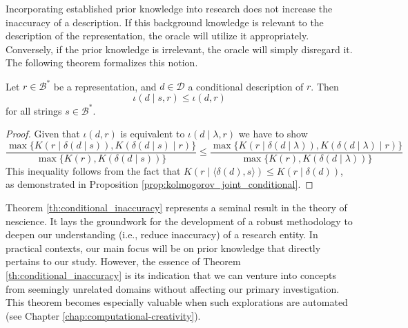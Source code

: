 Incorporating established prior knowledge into research does not increase the inaccuracy of a description. If this background knowledge is relevant to the description of the representation, the oracle will utilize it appropriately. Conversely, if the prior knowledge is irrelevant, the oracle will simply disregard it. The following theorem formalizes this notion.

\begin{theorem}
\label{th:conditional_inaccuracy}
Let $r \in \mathcal{B}^\ast$ be a representation, and $d \in \mathcal{D}$ a conditional description of $r$. Then
\[
\iota(d \mid s, r) \leq \iota(d , r)
\]
for all strings $s \in \mathcal{B}^\ast$.
\end{theorem}
\begin{proof}
Given that $\iota(d , r)$ is equivalent to $\iota(d \mid \lambda, r)$ we have to show 
\[
\frac{ \max\{ K \left(r \mid \delta(d \mid s) \right), K \left( \delta(d \mid s) \mid r \right) \} } { \max\{ K(r), K \left( \delta(d \mid s) \right) \} } \leq \frac{ \max\{ K \left(r \mid \delta(d \mid \lambda ) \right), K \left( \delta(d \mid \lambda ) \mid r \right) \} } { \max\{ K(r), K \left( \delta(d \mid \lambda ) \right) \} }
\]
This inequality follows from the fact that $K \left(r \mid \langle \delta(d), s \rangle \right) \leq  K \left(r \mid \delta(d) \right)$, as demonstrated in Proposition \ref{prop:kolmogorov_joint_conditional}.
\end{proof}

Theorem \ref{th:conditional_inaccuracy} represents a seminal result in the theory of nescience. It lays the groundwork for the development of a robust methodology to deepen our understanding (i.e., reduce inaccuracy) of a research entity. In practical contexts, our main focus will be on prior knowledge that directly pertains to our study. However, the essence of Theorem \ref{th:conditional_inaccuracy} is its indication that we can venture into concepts from seemingly unrelated domains without affecting our primary investigation. This theorem becomes especially valuable when such explorations are automated (see Chapter \ref{chap:computational-creativity}).

